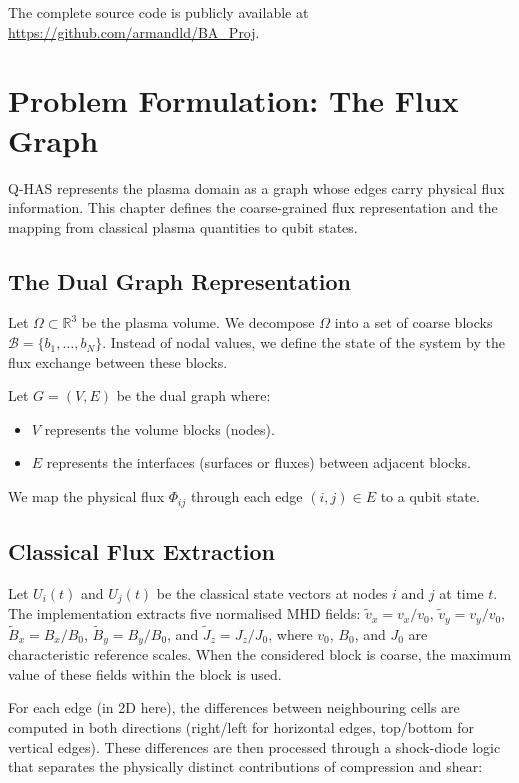 \documentclass[12pt, a4paper, oneside]{report}
\begin{document}
The complete source code is publicly available at \url{https://github.com/armandld/BA_Proj}.

\chapter{Problem Formulation: The Flux Graph}
\label{chap:flux-graph}

Q-HAS represents the plasma domain as a graph whose edges carry physical flux information. This chapter defines the coarse-grained flux representation and the mapping from classical plasma quantities to qubit states.

\section{The Dual Graph Representation}

Let $\Omega \subset \mathbb{R}^3$ be the plasma volume. We decompose $\Omega$ into a set of coarse blocks $\mathcal{B} = \{b_1, \dots, b_N\}$.
Instead of nodal values, we define the state of the system by the flux exchange between these blocks.

Let $G = (V, E)$ be the dual graph where:
\begin{itemize}
    \item $V$ represents the volume blocks (nodes).
    \item $E$ represents the interfaces (surfaces or fluxes) between adjacent blocks.
\end{itemize}

We map the physical flux $\Phi_{ij}$ through each edge $(i,j) \in E$ to a qubit state.

\section{Classical Flux Extraction}

Let $U_i(t)$ and $U_j(t)$ be the classical state vectors at nodes $i$ and $j$ at time $t$. The implementation extracts five normalised MHD fields: $\tilde{v}_x = v_x / v_0$, $\tilde{v}_y = v_y / v_0$, $\tilde{B}_x = B_x / B_0$, $\tilde{B}_y = B_y / B_0$, and $\tilde{J}_z = J_z / J_0$, where $v_0$, $B_0$, and $J_0$ are characteristic reference scales. When the considered block is coarse, the maximum value of these fields within the block is used.

For each edge (in 2D here), the differences between neighbouring cells are computed in both directions (right/left for horizontal edges, top/bottom for vertical edges). These differences are then processed through a shock-diode logic that separates the physically distinct contributions of compression and shear:
\end{document}
